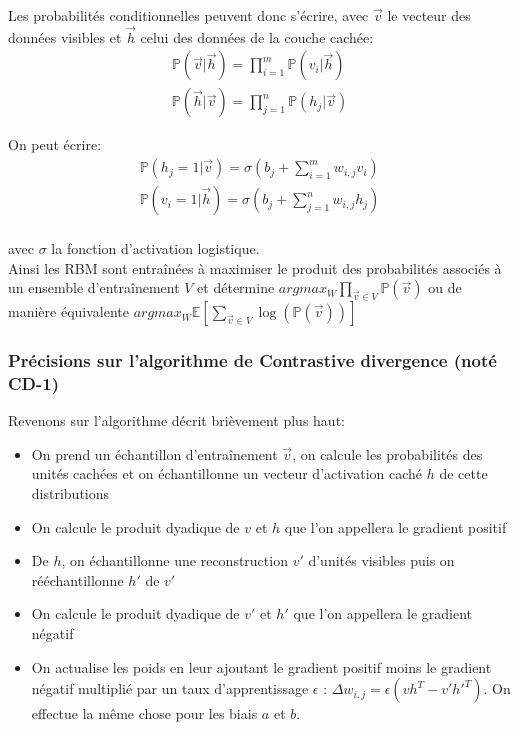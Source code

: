 \documentclass{article}
\theoremstyle{definition}
\begin{document}
\noindent Les probabilités conditionnelles peuvent donc s'écrire, avec $\vec{v}$ le vecteur des données visibles et $\vec{h}$ celui des données de la couche cachée:
\begin{align*}
\mathbb{P}(\vec{v}|\vec{h})=\prod_{i=1}^m \mathbb{P}(v_i|\vec{h})\\
\mathbb{P}(\vec{h}|\vec{v})=\prod_{j=1}^n \mathbb{P}(h_j|\vec{v})
\end{align*}

\noindent On peut écrire:
\begin{align*}
\mathbb{P}(h_j=1|\vec{v})=\sigma\left(b_j+\sum_{i=1}^m w_{i,j} v_i\right)\\
\mathbb{P}(v_i=1|\vec{h})=\sigma\left(b_j+\sum_{j=1}^n w_{i,j} h_j\right)\\
\end{align*}

\noindent avec $\sigma$ la fonction d'activation logistique.\\

\noindent Ainsi les RBM sont entraînées à maximiser le produit des probabilités associés à un ensemble d'entraînement $V$ et détermine $argmax_W \prod_{\vec{v}\in V}\mathbb{P}(\vec{v})$ ou de manière équivalente $argmax_W \mathbb{E}\left[\sum_{\vec{v}\in V} \log\left(\mathbb{P}(\vec{v})\right)\right]$

\subsubsection{Précisions sur l'algorithme de Contrastive divergence (noté CD-1)}

\noindent Revenons sur l'algorithme décrit brièvement plus haut:
\begin{itemize}
\item On prend un échantillon d'entraînement $\vec{v}$, on calcule les probabilités des unités cachées et on échantillonne un vecteur d'activation caché $h$ de cette distributions
\item On calcule le produit dyadique de $v$ et $h$ que l'on appellera le gradient positif
\item De $h$, on échantillonne une reconstruction $v'$ d'unités visibles puis on rééchantillonne $h'$ de $v'$
\item On calcule le produit dyadique de $v'$ et $h'$ que l'on appellera le gradient négatif
\item On actualise les poids en leur ajoutant le gradient positif moins le gradient négatif multiplié par un taux d'apprentissage $\epsilon$ : $\Delta w_{i,j}=\epsilon (vh^T-v'h'^T)$. On effectue la même chose pour les biais $a$ et $b$.
\end{itemize}
\end{document}
